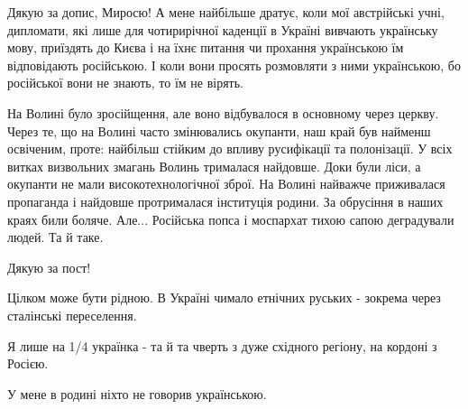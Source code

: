 \begin{itemize}
 

Дякую за допис, Миросю! А мене найбільше дратує, коли мої австрійські учні,
дипломати, які лише для чотирирічної каденції в Україні вивчають українську
мову, приїздять до Києва і на їхнє питання чи прохання українською їм
відповідають російською. І коли вони просять розмовляти з ними українською, бо
російської вони не знають, то їм не вірять. 🙁


 


На Волині було зросійщення, але воно відбувалося в основному через церкву.
Через те, що на Волині часто змінювались окупанти, наш край був найменш
освіченим, проте: найбільш стійким до впливу русифікації та полонізації. У всіх
витках визвольних змагань Волинь трималася найдовше. Доки були ліси, а окупанти
не мали високотехнологічної зброї. На Волині найважче приживалася пропаганда і
найдовше протрималася інституція родини. За обрусіння в наших краях били
боляче. Але... Російська попса і моспархат тихою сапою деградували людей. Та й
таке.


 
Дякую за пост!

 

Цілком може бути рідною. В Україні чимало етнічних руських - зокрема через
сталінські переселення.

Я лише на 1/4 українка - та й та чверть з дуже східного регіону, на кордоні з
Росією.

У мене в родині ніхто не говорив українською.


\end{itemize}
